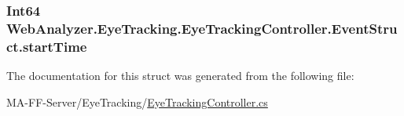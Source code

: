 \subsubsection[{start\+Time}]{\setlength{\rightskip}{0pt plus 5cm}Int64 Web\+Analyzer.\+Eye\+Tracking.\+Eye\+Tracking\+Controller.\+Event\+Struct.\+start\+Time}\label{struct_web_analyzer_1_1_eye_tracking_1_1_eye_tracking_controller_1_1_event_struct_ae43681b70dc05d38f8f6531dca8db700}


The documentation for this struct was generated from the following file\+:\begin{DoxyCompactItemize}
\item 
M\+A-\/\+F\+F-\/\+Server/\+Eye\+Tracking/\hyperlink{_eye_tracking_controller_8cs}{Eye\+Tracking\+Controller.\+cs}\end{DoxyCompactItemize}
